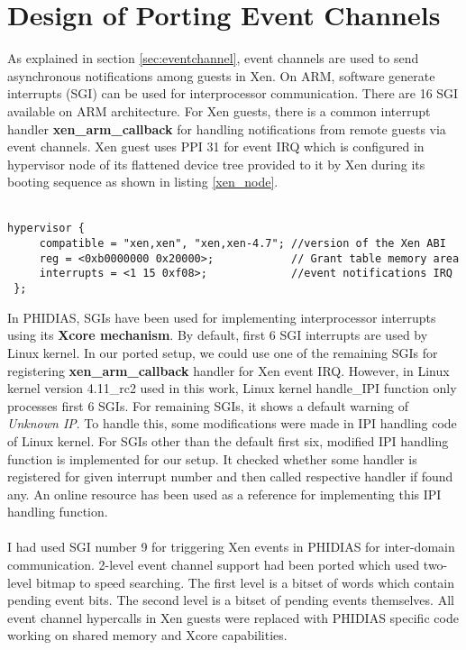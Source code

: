 \section{Design of Porting Event Channels\label{sec:eventstatic}}
As explained in section \ref{sec:eventchannel}, event channels are used to send asynchronous notifications among guests in Xen. On ARM, software generate interrupts (SGI) can be used for interprocessor communication. There are 16 SGI available on ARM architecture. For Xen guests, there is a common interrupt handler \textbf{xen\_arm\_callback} for handling notifications from remote guests via event channels. Xen guest uses PPI 31 for event IRQ which is configured in hypervisor node of its flattened device tree provided to it by Xen during its booting sequence as shown in listing \ref{xen_node}.
\\
\\
\begin{lstlisting}[caption=Xen Hypervisor node in hi6220 flattened device tree, label={xen_node}]
 hypervisor {
     compatible = "xen,xen", "xen,xen-4.7"; //version of the Xen ABI 
     reg = <0xb0000000 0x20000>;            // Grant table memory area 
     interrupts = <1 15 0xf08>;             //event notifications IRQ
 };

\end{lstlisting}
In PHIDIAS, SGIs have been used for implementing interprocessor interrupts using its \textbf{Xcore mechanism}. By default, first 6 SGI interrupts are used by Linux kernel. In our ported setup, we could use one of the remaining SGIs for registering \textbf{xen\_arm\_callback} handler for Xen event IRQ. However, in Linux kernel version 4.11\_rc2 used in this work, Linux kernel handle\_IPI function only processes first 6 SGIs. For remaining SGIs, it shows a default warning of \textit{Unknown IP}. To handle this, some modifications were made in IPI handling code of Linux kernel. For SGIs other than the default first six, modified IPI handling function is implemented for our setup. It checked whether some handler is registered for given interrupt number and then called respective handler if found any. An online resource \cite{smp} has been used as a reference for implementing this IPI handling function.
\\
\\
I had used SGI number 9 for triggering Xen events in PHIDIAS for inter-domain communication. 2-level event channel support had been ported which used two-level bitmap to speed searching. The first level is a bitset of words which contain pending event bits.  The second level is a bitset of pending events themselves. All event channel hypercalls in Xen guests were replaced with PHIDIAS specific code working on shared memory and Xcore capabilities. 

